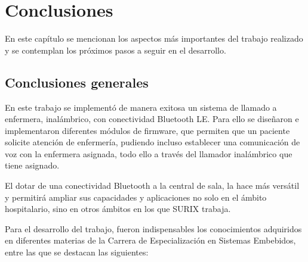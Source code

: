 
\chapter{Conclusiones} %

\label{Chapter5} %

En este capítulo se mencionan los aspectos más importantes del trabajo realizado y se contemplan los próximos pasos a seguir en el desarrollo.




\section{Conclusiones generales }

En este trabajo se implementó de manera exitosa un sistema de llamado a enfermera, inalámbrico, con conectividad Bluetooth LE. Para ello se diseñaron e implementaron diferentes módulos de firmware, que permiten que un paciente solicite atención de enfermería, pudiendo incluso establecer una comunicación de voz con la enfermera asignada, todo ello a través del llamador inalámbrico que tiene asignado.

El dotar de una conectividad Bluetooth a la central de sala, la hace más versátil y permitirá ampliar sus capacidades y aplicaciones no solo en el ámbito hospitalario, sino en otros ámbitos en los que SURIX trabaja.

Para el desarrollo del trabajo, fueron indispensables los conocimientos adquiridos en diferentes materias de la Carrera de Especialización en Sistemas Embebidos, entre las que se destacan las siguientes:


